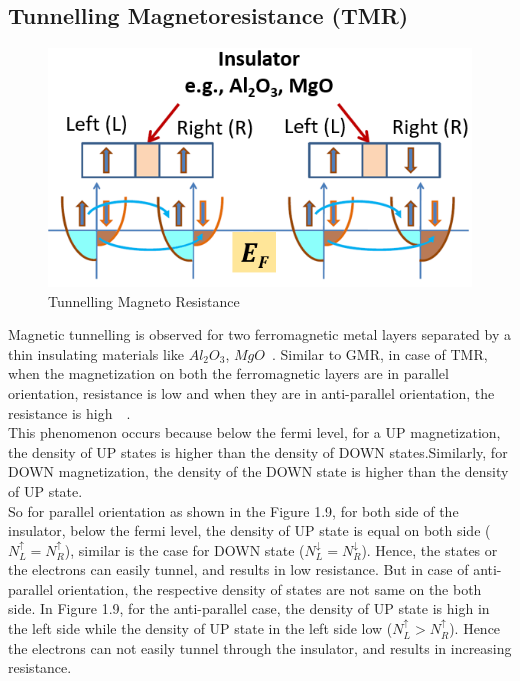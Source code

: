 \documentclass[12pt,a4paper,bold]{thesis}
\theoremstyle{thm}
\theoremstyle{definition}
\begin{document}
\subsection{Tunnelling Magnetoresistance (TMR)}
\begin{figure}[H]
	\centering
   \includegraphics[scale=0.56]{Images/26.png} 
   \caption{Tunnelling Magneto Resistance}
\end{figure}
Magnetic tunnelling is observed for two ferromagnetic metal layers separated by a thin insulating materials like $Al_2O_3$, $MgO$~\cite{julliere1975tunneling}. Similar to GMR, in case of TMR, when the magnetization on both the ferromagnetic layers are in parallel orientation, resistance is low and when they are in anti-parallel orientation, the resistance is high~\cite{moodera1995large}~\cite{miwa2014highly}.\\
This phenomenon occurs because below the fermi level, for a UP magnetization, the density of UP states is higher than the density of DOWN states.Similarly, for DOWN magnetization, the density of the DOWN state is higher than the density of UP state.~\cite{RefWorks:786}\\
So for parallel orientation as shown in the Figure 1.9, for both side of the insulator, below the fermi level, the density of UP state is equal on both side ($N_L^{\uparrow}=N_R^{\uparrow}$), similar is the case for DOWN state ($N_L^{\downarrow}=N_R^{\downarrow}$). Hence, the states or the electrons can easily tunnel, and results in low resistance. But in case of anti-parallel orientation, the respective density of states are not same on the both side. In Figure 1.9, for the anti-parallel case, the density of UP state is high in the left side while the density of UP state in the left side low ($N_L^{\uparrow}>N_R^{\uparrow}$). Hence the electrons can not easily tunnel through the insulator, and results in increasing resistance.~\cite{RefWorks:300}~\cite{RefWorks:33}\\
\end{document}
